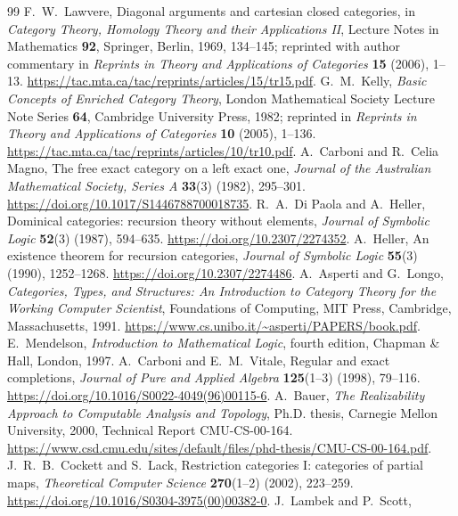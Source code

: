 \documentclass[11pt]{article}
\theoremstyle{definition}
\theoremstyle{remark}
\begin{document}
\begin{thebibliography}{99}
 F.~W.~Lawvere,
Diagonal arguments and cartesian closed categories,
in \emph{Category Theory, Homology Theory and their Applications II},
Lecture Notes in Mathematics \textbf{92}, Springer, Berlin, 1969,
134--145; reprinted with author commentary in
\emph{Reprints in Theory and Applications of Categories}
\textbf{15} (2006), 1--13.
\url{https://tac.mta.ca/tac/reprints/articles/15/tr15.pdf}.
 G.~M.~Kelly,
\emph{Basic Concepts of Enriched Category Theory},
London Mathematical Society Lecture Note Series \textbf{64},
Cambridge University Press, 1982; reprinted in
\emph{Reprints in Theory and Applications of Categories}
\textbf{10} (2005), 1--136.
\url{https://tac.mta.ca/tac/reprints/articles/10/tr10.pdf}.
 A.~Carboni and R.~Celia Magno,
The free exact category on a left exact one,
\emph{Journal of the Australian Mathematical Society, Series A}
\textbf{33}(3) (1982), 295--301.
\url{https://doi.org/10.1017/S1446788700018735}.
 R.~A.~Di Paola and A.~Heller,
Dominical categories: recursion theory without elements,
\emph{Journal of Symbolic Logic} \textbf{52}(3) (1987), 594--635.
\url{https://doi.org/10.2307/2274352}.
 A.~Heller,
An existence theorem for recursion categories,
\emph{Journal of Symbolic Logic} \textbf{55}(3) (1990), 1252--1268.
\url{https://doi.org/10.2307/2274486}.
 A.~Asperti and G.~Longo,
\emph{Categories, Types, and Structures:
An Introduction to Category Theory for the Working Computer Scientist},
Foundations of Computing, MIT Press, Cambridge, Massachusetts, 1991.
\url{https://www.cs.unibo.it/~asperti/PAPERS/book.pdf}.
 E.~Mendelson,
\emph{Introduction to Mathematical Logic}, fourth edition,
Chapman \& Hall, London, 1997.
 A.~Carboni and E.~M.~Vitale,
Regular and exact completions,
\emph{Journal of Pure and Applied Algebra} \textbf{125}(1--3) (1998),
79--116. \url{https://doi.org/10.1016/S0022-4049(96)00115-6}.
 A.~Bauer,
\emph{The Realizability Approach to Computable Analysis and Topology},
Ph.D. thesis, Carnegie Mellon University, 2000,
Technical Report CMU-CS-00-164.
\url{https://www.csd.cmu.edu/sites/default/files/phd-thesis/CMU-CS-00-164.pdf}.
 J.~R.~B.~Cockett and S.~Lack,
Restriction categories I: categories of partial maps,
\emph{Theoretical Computer Science} \textbf{270}(1--2) (2002),
223--259. \url{https://doi.org/10.1016/S0304-3975(00)00382-0}.
 J.~Lambek and P.~Scott,

\end{thebibliography}
\end{document}
